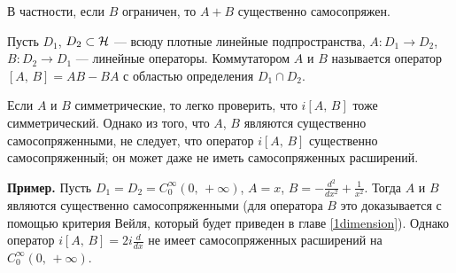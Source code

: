 \documentclass[a4paper
]{article}
\begin{document}
В частности, если $B$ ограничен, то $A+B$ существенно самосопряжен. \par
\begin{Def}
Пусть $D_1$, $D_2\subset {\cal H}$ --- всюду плотные линейные подпространства,
$A:D_1\rightarrow D_2$, $B:D_2\rightarrow D_1$ --- линейные операторы.
Коммутатором $A$ и $B$ называется оператор $[A, \, B]=AB-BA$ с областью
определения $D_1\cap D_2$.
\end{Def}
Если $A$ и $B$ симметрические, то легко проверить, что $i[A, \, B]$
тоже симметрический. Однако из того, что $A$, $B$ являются существенно
самосопряженными, не следует, что оператор $i[A, \, B]$ существенно
самосопряженный; он может даже не иметь самосопряженных расширений. \par
{\bf Пример.} Пусть $D_1=D_2=C_0^\infty(0, \, +\infty)$,
$A=x$, $B=-\frac{d^2}{dx^2}+\frac{1}{x^2}$. Тогда $A$ и $B$ являются
существенно самосопряженными (для оператора $B$ это доказывается с
помощью критерия Вейля, который будет приведен в главе \ref{1dimension}).
Однако оператор $i[A, \, B]=2i\frac{d}{dx}$ не имеет самосопряженных
расширений на $C_0^\infty(0, \, +\infty)$. \par
\end{document}
